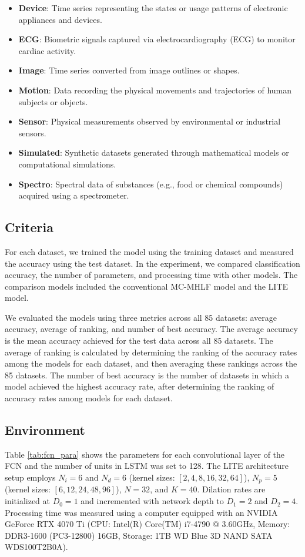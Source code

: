 \documentclass[conference]{IEEEtran}
\begin{document}
\begin{itemize}
    \item \textbf{Device}: Time series representing the states or usage patterns of electronic appliances and devices.
    \item \textbf{ECG}: Biometric signals captured via electrocardiography (ECG) to monitor cardiac activity.
    \item \textbf{Image}: Time series converted from image outlines or shapes.
    \item \textbf{Motion}: Data recording the physical movements and trajectories of human subjects or objects.
    \item \textbf{Sensor}: Physical measurements observed by environmental or industrial sensors.
    \item \textbf{Simulated}: Synthetic datasets generated through mathematical models or computational simulations.
    \item \textbf{Spectro}: Spectral data of substances (e.g., food or chemical compounds) acquired using a spectrometer.
\end{itemize}

\subsection{Criteria}
For each dataset, we trained the model using the training dataset and measured the accuracy using the test dataset. In the experiment, we compared classification accuracy, the number of parameters, and processing time with other models. The comparison models included the conventional MC-MHLF model and the LITE model. 

We evaluated the models using three metrics across all 85 datasets: average
accuracy, average of ranking, and number of best accuracy. The average accuracy
is the mean accuracy achieved for the test data across all 85 datasets. The
average of ranking is calculated by determining the ranking of the accuracy rates
among the models for each dataset, and then averaging these rankings across
the 85 datasets. The number of best accuracy is the number of datasets in which
a model achieved the highest accuracy rate, after determining the ranking of
accuracy rates among models for each dataset. 

\subsection{Environment}
Table \ref{tab:fcn_para} shows the parameters for each convolutional layer of the FCN and the number of units in LSTM was set to 128. 
The LITE architecture setup employs $N_i=6$ and $N_d=6$ (kernel sizes: $[2, 4, 8, 16, 32, 64]$), $N_p=5$ (kernel sizes: $[6, 12, 24, 48, 96]$), $N=32$, and $K=40$. Dilation rates are initialized at $D_0=1$ and incremented with network depth to $D_1=2$ and $D_2=4$.
Processing time was measured using a computer equipped with an NVIDIA GeForce RTX 4070 Ti (CPU: Intel(R) Core(TM) i7-4790 @ 3.60GHz, Memory: DDR3-1600 (PC3-12800) 16GB, Storage: 1TB WD Blue 3D NAND SATA WDS100T2B0A).
\end{document}
